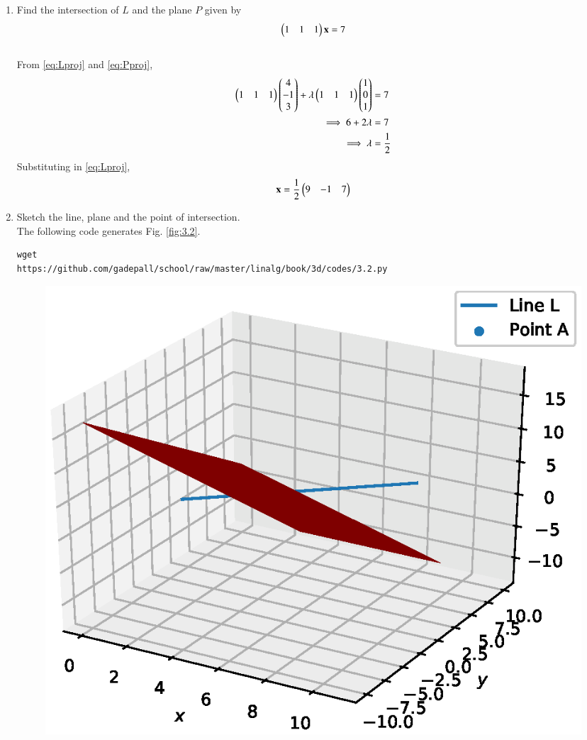 \begin{enumerate}[label=\arabic*.,ref=\thesubsection.\theenumi]
\item Find the intersection of $L$ and the plane $P$ given by
\begin{equation}
\begin{pmatrix}1 & 1 & 1\end{pmatrix}\mathbf{x} = 7
\label{eq:Pproj}
\end{equation}
\\
\solution From \eqref{eq:Lproj} and \eqref{eq:Pproj},
\begin{align}
 \begin{pmatrix}1 & 1 & 1\end{pmatrix}\begin{pmatrix}4 \\ -1 \\ 3\end{pmatrix} + \lambda \begin{pmatrix}1 & 1 & 1\end{pmatrix}
\begin{pmatrix}1 \\ 0 \\ 1\end{pmatrix} &= 7
\\
\implies 6 + 2\lambda &= 7
\\
\implies \lambda &= \frac{1}{2}
\end{align}
%
Substituting in \eqref{eq:Lproj},
\begin{equation}
\mathbf{x} = \frac{1}{2}\begin{pmatrix}9 & -1 & 7\end{pmatrix}
\end{equation}
\item Sketch the line, plane and the point of intersection.
\\
\solution The following code generates Fig. \ref{fig:3.2}.
\begin{lstlisting}
wget 
https://github.com/gadepall/school/raw/master/linalg/book/3d/codes/3.2.py
\end{lstlisting}
\begin{figure}[!ht]
\centering
\includegraphics[width=\columnwidth]{./3d/figs/3.2.eps}

\end{figure}
\end{enumerate}
